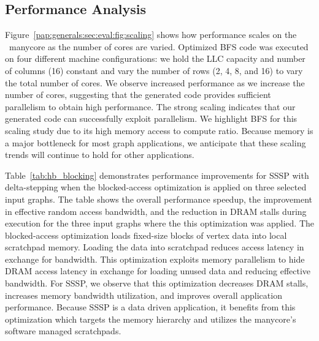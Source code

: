 \subsection{Performance Analysis}
Figure~\ref{pap:generals:sec:eval:fig:scaling} shows how performance scales on the \hb~manycore as the number of cores are varied.
Optimized BFS code was executed on four different machine configurations: we hold the LLC capacity and number of columns (16) constant
and vary the number of rows (2, 4, 8, and 16) to vary the total number of cores.
We observe increased performance as we increase the number of cores, suggesting that the generated code provides sufficient parallelism to obtain high performance.
The strong scaling indicates that our generated code can successfully exploit parallelism.
We highlight BFS for this scaling study due to its high memory access to compute ratio.
Because memory is a major bottleneck for most graph applications, we anticipate that these scaling trends will continue to hold for other applications. 

Table~\ref{tab:hb_blocking} demonstrates performance improvements for SSSP with delta-stepping when the blocked-access optimization is applied on three selected input graphs.
The table shows the overall performance speedup, the improvement in effective random access bandwidth, and the reduction in DRAM stalls during execution for the three input graphs where the this optimization was applied.
The blocked-access optimization loads fixed-size blocks of vertex data into local scratchpad memory.
Loading the data into scratchpad reduces access latency in exchange for bandwidth.
This optimization exploits memory parallelism to hide DRAM access latency in exchange for loading unused data and reducing effective bandwidth.
For SSSP, we observe that this optimization decreases DRAM stalls, increases memory bandwidth utilization, and improves overall application performance.
Because SSSP is a data driven application, it benefits from this optimization which targets the memory hierarchy and utilizes the manycore's software managed scratchpads.

